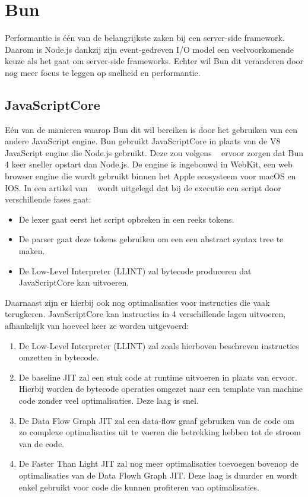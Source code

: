 \section{Bun}
Performantie is één van de belangrijkste zaken bij een server-side framework. 
Daarom is Node.js dankzij zijn event-gedreven I/O model een veelvoorkomende keuze als het gaat om server-side frameworks.
Echter wil Bun dit veranderen door nog meer focus te leggen op snelheid en performantie.


\subsection{JavaScriptCore}
Eén van de manieren waarop Bun dit wil bereiken is door het gebruiken van een andere JavaScript engine.
Bun gebruikt JavaScriptCore in plaats van de V8 JavaScript engine die Node.js gebruikt. 
Deze zou volgens ~\textcite{McDonnel2023} ervoor zorgen dat Bun 4 keer sneller opstart dan Node.js. 
De engine is ingebouwd in WebKit, een web browser engine die wordt gebruikt binnen het Apple ecosysteem voor macOS en IOS.
In een artikel van ~\textcite{Pizlo2020} wordt uitgelegd dat bij de executie een script door verschillende fases gaat:
\begin{itemize}
    \item De lexer gaat eerst het script opbreken in een reeks tokens.
    \item De parser gaat deze tokens gebruiken om een een abstract syntax tree te maken.
    \item De Low-Level Interpreter (LLINT) zal bytecode produceren dat JavaScriptCore kan uitvoeren.
\end{itemize}
Daarnaast zijn er hierbij ook nog optimalisaties voor instructies die vaak terugkeren. 
JavaScriptCore kan instructies in 4 verschillende lagen uitvoeren, afhankelijk van hoeveel keer ze worden uitgevoerd:
\begin{enumerate}
    \item De Low-Level Interpreter (LLINT) zal zoals hierboven beschreven instructies omzetten in bytecode.
    \item De baseline JIT zal een stuk code at runtime uitvoeren in plaats van ervoor. 
    Hierbij worden de bytecode operaties omgezet naar een template van machine code zonder veel optimalisaties. Deze laag is snel.
    \item De Data Flow Graph JIT zal een data-flow graaf gebruiken van de code om zo complexe optimalisaties uit te voeren die betrekking hebben tot de stroom van de code.
    \item De Faster Than Light JIT zal nog meer optimalisaties toevoegen bovenop de optimalisaties van de Data Flowh Graph JIT. 
    Deze laag is duurder en wordt enkel gebruikt voor code die kunnen profiteren van optimalisaties.
\end{enumerate}
